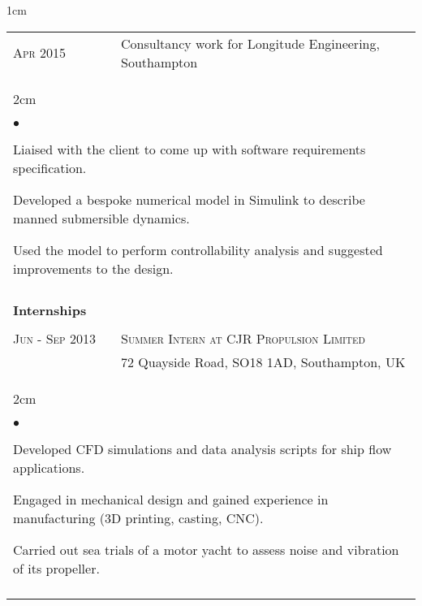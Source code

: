 \documentclass[a4paper,10pt]{article}
\newcommand{\squishlist}{
	\begin{list}{$\bullet$}
	{
		\setlength{\itemsep}{0pt}
		\setlength{\parsep}{0pt}
		\setlength{\topsep}{0pt}
		\setlength{\partopsep}{0pt}
		\setlength{\leftmargin}{2em}
		\setlength{\labelwidth}{1.5em}
		\setlength{\labelsep}{0.5em}
	}
}
\newcommand{\squishend}{\end{list}}
\begin{document}
\begin{minipage}{\textwidth}
\begin{adjustwidth}{}{1cm}
\begin{tabular}{p{3.5cm} p{12.9cm}}
\textsc{Apr 2015} & Consultancy work for Longitude Engineering, Southampton \vspace{0.1cm} \\
%
\multicolumn{2}{l}{
\hspace{1cm}\begin{minipage}[t]{\textwidth}
\begin{adjustwidth}{}{2cm}
\squishlist
	\item Liaised with the client to come up with software requirements specification.
	\item Developed a bespoke numerical model in Simulink to describe manned submersible dynamics.
	\item Used the model to perform controllability analysis and suggested improvements to the design.
\squishend
\end{adjustwidth}
\end{minipage}
} \\


\\
\textbf{Internships} \\
\\

\textsc{Jun - Sep 2013} & \textsc{Summer Intern at CJR Propulsion Limited} \\
						& 72 Quayside Road, SO18 1AD, Southampton, UK \vspace{0.1cm} \\
%
\multicolumn{2}{l}{
\hspace{1cm}\begin{minipage}[t]{\textwidth}
\begin{adjustwidth}{}{2cm}
\squishlist
	\item Developed CFD simulations and data analysis scripts for ship flow applications.
	\item Engaged in mechanical design and gained experience in manufacturing (3D printing, casting, CNC).
	\item Carried out sea trials of a motor yacht to assess noise and vibration of its propeller.
\squishend
\end{adjustwidth}
\end{minipage}
} \\
\\


\end{tabular}
\end{adjustwidth}
\end{minipage}
\end{document}
